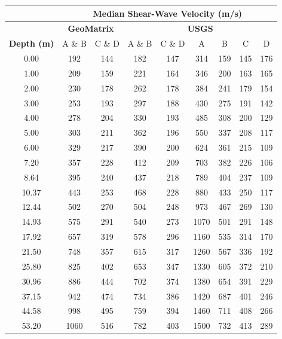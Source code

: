 \documentclass[12pt,oneside]{book}
\begin{document}
\begin{table}[tbp]
    \centering
    \begin{tabular}{ccc|cccccc}
        \hline\hline
        & \multicolumn{8}{c}{\textbf{Median Shear-Wave Velocity (m/s)}} \\
        \hline
        & \multicolumn{2}{c|}{\textbf{GeoMatrix}}
        & \multicolumn{6}{c}{\textbf{USGS}} \\
        \hline
        \textbf{Depth (m)} & A \& B & C \& D & A \& B & C \& D &
        A & B & C & D  \\
        \hline
        0.00 &  192 & 144 & 182 & 147 &  314 & 159 & 145 & 176 \\
        1.00 &  209 & 159 & 221 & 164 &  346 & 200 & 163 & 165 \\
        2.00 &  230 & 178 & 262 & 178 &  384 & 241 & 179 & 154 \\
        3.00 &  253 & 193 & 297 & 188 &  430 & 275 & 191 & 142 \\
        4.00 &  278 & 204 & 330 & 193 &  485 & 308 & 200 & 129 \\
        5.00 &  303 & 211 & 362 & 196 &  550 & 337 & 208 & 117 \\
        6.00 &  329 & 217 & 390 & 200 &  624 & 361 & 215 & 109 \\
        7.20 &  357 & 228 & 412 & 209 &  703 & 382 & 226 & 106 \\
        8.64 &  395 & 240 & 437 & 218 &  789 & 404 & 237 & 109 \\
        10.37 &  443 & 253 & 468 & 228 &  880 & 433 & 250 & 117 \\
        12.44 &  502 & 270 & 504 & 248 &  973 & 467 & 269 & 130 \\
        14.93 &  575 & 291 & 540 & 273 & 1070 & 501 & 291 & 148 \\
        17.92 &  657 & 319 & 578 & 296 & 1160 & 535 & 314 & 170 \\
        21.50 &  748 & 357 & 615 & 317 & 1260 & 567 & 336 & 192 \\
        25.80 &  825 & 402 & 653 & 347 & 1330 & 605 & 372 & 210 \\
        30.96 &  886 & 444 & 702 & 374 & 1380 & 654 & 391 & 229 \\
        37.15 &  942 & 474 & 734 & 386 & 1420 & 687 & 401 & 246 \\
        44.58 &  998 & 495 & 759 & 394 & 1460 & 711 & 408 & 266 \\
        53.20 & 1060 & 516 & 782 & 403 & 1500 & 732 & 413 & 289 \\

\end{tabular}
\end{table}
\end{document}
